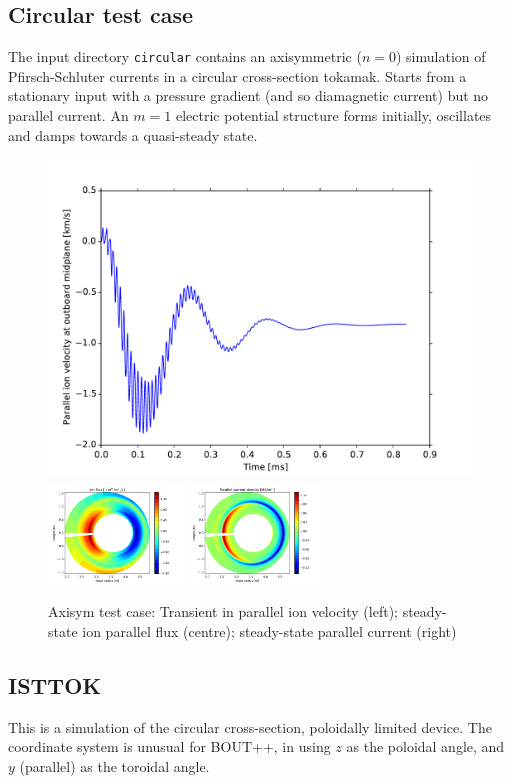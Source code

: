 \documentclass[12pt,a4paper]{article}
\begin{document}
\subsection{Circular test case}

The input directory \texttt{circular} contains an axisymmetric ($n=0$) simulation of Pfirsch-Schluter currents
in a circular cross-section tokamak. Starts from a stationary input with
a pressure gradient (and so diamagnetic current) but no parallel current. An $m=1$ electric potential
structure forms initially, oscillates and damps towards a quasi-steady state.

\begin{figure}[h]
\centering
\includegraphics[width=0.32\columnwidth]{figs/axisym-vi-time.pdf}
\includegraphics[width=0.32\textwidth]{figs/axisym-ion-flux.pdf}
\includegraphics[width=0.32\textwidth]{figs/axisym-jpar.pdf}
\caption{Axisym test case: Transient in parallel ion velocity (left); steady-state ion parallel flux (centre); steady-state parallel current (right)}
\label{fig:axisym}
\end{figure}

\subsection{ISTTOK}

This is a simulation of the circular cross-section, poloidally limited device. The coordinate system
is unusual for BOUT++, in using $z$ as the poloidal angle, and $y$ (parallel) as the toroidal angle.
\end{document}
